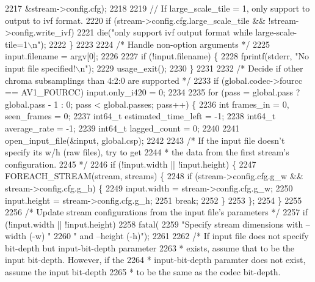 \begin{DoxyCodeInclude}
{{{{{{{{{{{{{{{{{{{{{{{{{{{{{{{{{{{{{{{{{{{{{{{{{{{{2217                          &stream->config.cfg);
2218 
2219     \textcolor{comment}{// If large\_scale\_tile = 1, only support to output to ivf format.}
2220     \textcolor{keywordflow}{if} (stream->config.cfg.large\_scale\_tile && !stream->config.write\_ivf)
2221       die(\textcolor{stringliteral}{"only support ivf output format while large-scale-tile=1\(\backslash\)n"});
2222   \}
2223 
2224   \textcolor{comment}{/* Handle non-option arguments */}
2225   input.filename = argv[0];
2226 
2227   \textcolor{keywordflow}{if} (!input.filename) \{
2228     fprintf(stderr, \textcolor{stringliteral}{"No input file specified!\(\backslash\)n"});
2229     usage\_exit();
2230   \}
2231 
2232   \textcolor{comment}{/* Decide if other chroma subsamplings than 4:2:0 are supported */}
2233   \textcolor{keywordflow}{if} (global.codec->fourcc == AV1\_FOURCC) input.only\_i420 = 0;
2234 
2235   \textcolor{keywordflow}{for} (pass = global.pass ? global.pass - 1 : 0; pass < global.passes; pass++) \{
2236     \textcolor{keywordtype}{int} frames\_in = 0, seen\_frames = 0;
2237     int64\_t estimated\_time\_left = -1;
2238     int64\_t average\_rate = -1;
2239     int64\_t lagged\_count = 0;
2240 
2241     open\_input\_file(&input, global.csp);
2242 
2243     \textcolor{comment}{/* If the input file doesn't specify its w/h (raw files), try to get}
2244 \textcolor{comment}{     * the data from the first stream's configuration.}
2245 \textcolor{comment}{     */}
2246     \textcolor{keywordflow}{if} (!input.width || !input.height) \{
2247       FOREACH\_STREAM(stream, streams) \{
2248         \textcolor{keywordflow}{if} (stream->config.cfg.g\_w && stream->config.cfg.g\_h) \{
2249           input.width = stream->config.cfg.g\_w;
2250           input.height = stream->config.cfg.g\_h;
2251           \textcolor{keywordflow}{break};
2252         \}
2253       \};
2254     \}
2255 
2256     \textcolor{comment}{/* Update stream configurations from the input file's parameters */}
2257     \textcolor{keywordflow}{if} (!input.width || !input.height)
2258       fatal(
2259           \textcolor{stringliteral}{"Specify stream dimensions with --width (-w) "}
2260           \textcolor{stringliteral}{" and --height (-h)"});
2261 
2262     \textcolor{comment}{/* If input file does not specify bit-depth but input-bit-depth parameter}
2263 \textcolor{comment}{     * exists, assume that to be the input bit-depth. However, if the}
2264 \textcolor{comment}{     * input-bit-depth paramter does not exist, assume the input bit-depth}
2265 \textcolor{comment}{     * to be the same as the codec bit-depth.}
}}}}}}}}}}}}}}}}}}}}}}}}}}}}}}}}}}}}}}}}}}}}}}}}}}}}
\end{DoxyCodeInclude}
